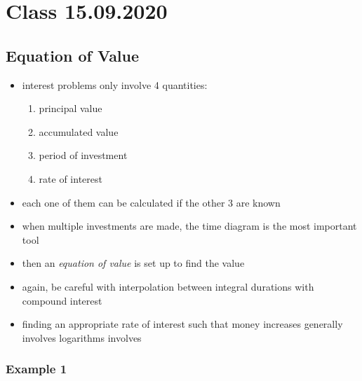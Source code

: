 \documentclass[../00_main.tex]{subfiles}
\begin{document}
\section{Class 15.09.2020}

\subsection{Equation of Value}

\begin{itemize}
    \item interest problems only involve 4 quantities:
        \begin{enumerate}
            \item principal value
            \item accumulated value
            \item period of investment
            \item rate of interest
        \end{enumerate}
    \item each one of them can be calculated if the other 3 are known
    \item when multiple investments are made, the time diagram is the most
        important tool
    \item then an \textit{equation of value} is set up to find the value
    \item again, be careful with interpolation between integral durations with
        compound interest
    \item finding an appropriate rate of interest such that money increases
        generally involves logarithms involves 
\end{itemize}

\subsubsection{Example 1}
\end{document}

